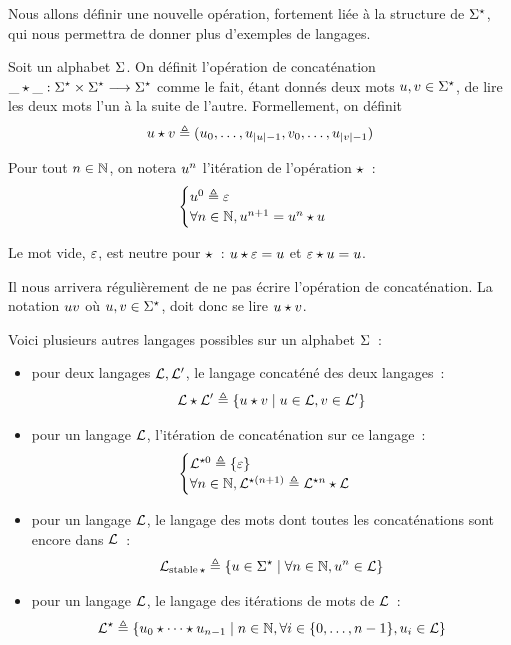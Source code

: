 Nous allons définir une nouvelle opération, fortement liée à la structure de
$\Sigma^{\star}$, qui nous permettra de donner plus d'exemples de langages.

\begin{definition}[Concaténation]
  Soit un alphabet $\Sigma$. On définit l'opération de concaténation
  $\mathord{\_}\mathbin{\star}\mathord{\_} : \displaystyle \Sigma^{\star}\times\Sigma^{\star} \longrightarrow \Sigma^{\star}$ comme le fait,
  étant donnés deux mots $u,v\in\Sigma^{\star}$, de lire les deux mots l'un à
  la suite de l'autre. Formellement, on définit
  \[u\mathbin{\star}v \triangleq
  (u_0,\ldots,u_{\left|u\right|-1},v_0,\ldots,u_{\left|v\right|-1})\]

  Pour tout $n\in \mathbb N$, on notera $u^n$ l'itération de l'opération
  $\mathbin{\star}$~:
  \[\begin{cases}
  u^0 \triangleq \varepsilon \\
  \forall n \in \mathbb N, u^{n+1} = u^n \mathbin{\star} u
  \end{cases}\]
  \index[notation]{$\varwd\wdPt\varwv$}
\end{definition}

\begin{remark}
  Le mot vide, $\varepsilon$, est neutre pour $\mathbin{\star}$~: $u\mathbin{\star}\varepsilon = u$
  et $\varepsilon \mathbin{\star} u = u$.
\end{remark}

\begin{notation}
  Il nous arrivera régulièrement de ne pas écrire l'opération de concaténation.
  La notation $uv$ où $u,v\in\Sigma^{\star}$, doit donc se lire
  $\varwd\wdPt\varwv$.
\end{notation}

\begin{example}
  Voici plusieurs autres langages possibles sur un alphabet $\Sigma$~:
  \begin{itemize}
  \item pour deux langages $\mathcal L,\mathcal L'$, le langage concaténé des deux
    langages~:
    \[\mathcal L\mathbin{\star}\mathcal L'\triangleq
    \left\{ u\mathbin{\star}v \;\middle\vert\; u\in\mathcal L,v\in \mathcal L' \right\}\]
  \item pour un langage $\mathcal L$, l'itération de concaténation sur ce langage~:
    \[\begin{cases}
    \mathcal L^{\mathbin{\star} 0} \triangleq \{\varepsilon\}\\
    \forall n \in \mathbb N, \mathcal L^{\mathbin{\star}(n+1)} \triangleq \mathcal L^{\mathbin{\star} n}\mathbin{\star}\mathcal L
    \end{cases}\]
  \item pour un langage $\mathcal L$, le langage des mots dont toutes les
    concaténations sont encore dans $\mathcal L$~:
    \[\mathcal L_{\operatorname{stable}\mathord{\mathbin{\star}}}\triangleq
    \left\{ u\in\Sigma^{\star} \;\middle\vert\; \forall n \in \mathbb N, u^n \in \mathcal L \right\}\]
  \item pour un langage $\mathcal L$, le langage des itérations de mots de
    $\mathcal L$~:
    \[\mathcal L^{\star} \triangleq
    \left\{ u_0\mathbin{\star}\cdots\mathbin{\star}u_{n-1} \;\middle\vert\; n \in \mathbb N,
      \forall i\in \{0,\ldots,n - 1\}, u_i \in \mathcal L \right\}\]
  \end{itemize}
\end{example}

